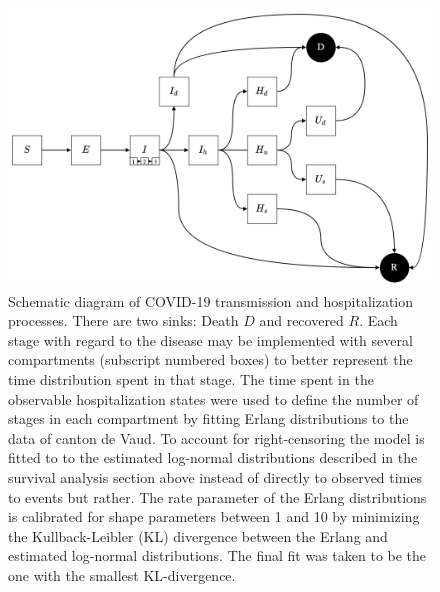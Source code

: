  \begin{figure}[!htb]
\begin{center}
\includegraphics{fig_covid-switzerland-npi/fig_supp/diagram.png}
\caption[Schematic diagram of COVID-19 transmission and hospitalization processes.]{Schematic diagram of COVID-19 transmission and hospitalization processes. There are two sinks: Death $D$ and recovered $R$. Each stage with regard to the disease may be implemented with several compartments (subscript numbered boxes) to better represent the time distribution spent in that stage. The time spent in the observable hospitalization states were used to define the number of stages in each compartment by fitting Erlang distributions to the data of canton de Vaud. To account for right-censoring the model is fitted to to the estimated log-normal distributions described in the survival analysis section above instead of directly to observed times to events but rather. The rate parameter of the Erlang distributions is calibrated for shape parameters between 1 and 10 by minimizing the Kullback-Leibler (KL) divergence between the Erlang and estimated log-normal distributions. The final fit was taken to be the one with the smallest KL-divergence.}
\label{fig:covid-ch-diagram}
\end{center}
\end{figure}
